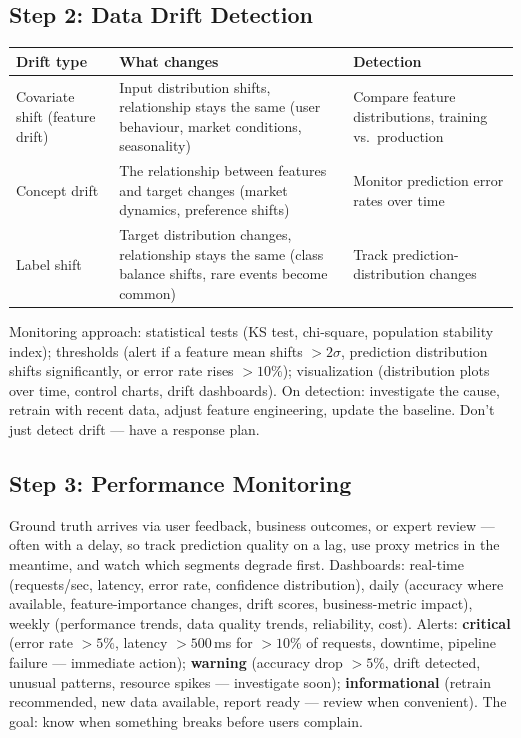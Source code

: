\subsection{Step 2: Data Drift Detection}

\begin{longtable}{p{} p{} p{}}
\toprule
\textbf{Drift type} & \textbf{What changes} & \textbf{Detection} \\
\midrule
\endhead
Covariate shift (feature drift) & Input distribution shifts, relationship stays the same (user behaviour, market
conditions, seasonality) & Compare feature distributions, training vs.\ production \\
Concept drift & The relationship between features and target changes (market dynamics, preference shifts) &
Monitor prediction error rates over time \\
Label shift & Target distribution changes, relationship stays the same (class balance shifts, rare events become
common) & Track prediction-distribution changes \\
\bottomrule
\end{longtable}

Monitoring approach: statistical tests (KS test, chi-square, population stability index); thresholds (alert if a
feature mean shifts $>2\sigma$, prediction distribution shifts significantly, or error rate rises $>10\%$);
visualization (distribution plots over time, control charts, drift dashboards). On detection: investigate the
cause, retrain with recent data, adjust feature engineering, update the baseline. Don't just detect drift --- have
a response plan.

\subsection{Step 3: Performance Monitoring}

Ground truth arrives via user feedback, business outcomes, or expert review --- often with a delay, so track
prediction quality on a lag, use proxy metrics in the meantime, and watch which segments degrade first.
Dashboards: real-time (requests/sec, latency, error rate, confidence distribution), daily (accuracy where
available, feature-importance changes, drift scores, business-metric impact), weekly (performance trends, data
quality trends, reliability, cost). Alerts: \textbf{critical} (error rate $>5\%$, latency $>500$\,ms for $>10\%$
of requests, downtime, pipeline failure --- immediate action); \textbf{warning} (accuracy drop $>5\%$, drift
detected, unusual patterns, resource spikes --- investigate soon); \textbf{informational} (retrain recommended,
new data available, report ready --- review when convenient). The goal: know when something breaks before users
complain.

